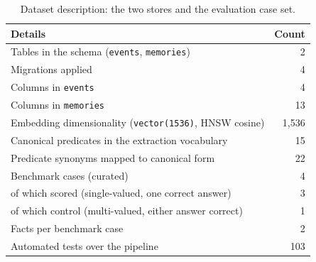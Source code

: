 \documentclass[11pt,a4paper]{article}
\begin{document}
\begin{table}[htbp]
\centering
\caption{Dataset description: the two stores and the evaluation case set.}
\label{tab:counts}
\begin{tabular}{l r}
\toprule
\textbf{Details} & \textbf{Count}\\
\midrule
Tables in the schema (\texttt{events}, \texttt{memories}) & 2\\
Migrations applied & 4\\
Columns in \texttt{events} & 4\\
Columns in \texttt{memories} & 13\\
Embedding dimensionality (\texttt{vector(1536)}, HNSW cosine) & 1{,}536\\
Canonical predicates in the extraction vocabulary & 15\\
Predicate synonyms mapped to canonical form & 22\\
Benchmark cases (curated) & 4\\
\quad of which scored (single-valued, one correct answer) & 3\\
\quad of which control (multi-valued, either answer correct) & 1\\
Facts per benchmark case & 2\\
Automated tests over the pipeline & 103\\
\bottomrule
\end{tabular}
\end{table}
\end{document}

